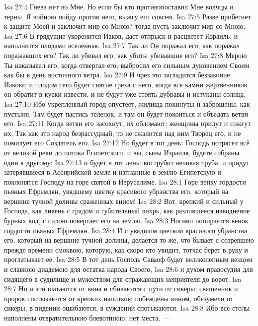\vs Isa 27:4 Гнева нет во Мне. Но если бы кто противопоставил Мне  волчцы и терны, Я войною пойду против него, выжгу его совсем.
\vs Isa 27:5 Разве прибегнет к защите Моей и заключит мир со Мною? тогда пусть заключит мир со Мною.
\vs Isa 27:6 В грядущие  укоренится Иаков, даст отпрыск и расцветет Израиль; и наполнится плодами вселенная.
\vs Isa 27:7 Так ли Он поражал его, как поражал поражавших его? Так ли убивал его, как убиты убивавшие его?
\vs Isa 27:8 Мерою Ты наказывал его, когда отвергал его; выбросил его сильным дуновением Своим как бы в день восточного ветра.
\vs Isa 27:9 И чрез это загладится беззаконие Иакова; и плодом сего будет снятие греха с него, когда все камни жертвенников он обратит в куски извести, и не будут уже стоять дубравы и истуканы солнца.
\vs Isa 27:10 Ибо укрепленный город опустеет, жилища  покинуты и заброшены, как пустыня. Там будет пастись теленок, и там он будет покоиться и объедать ветви его.
\vs Isa 27:11 Когда ветви его засохнут, их обломают; женщины придут и сожгут их. Так как это народ безрассудный, то не сжалится над ним Творец его, и не помилует его Создатель его.
\vs Isa 27:12 Но будет в тот день: Господь потрясет всё от великой реки до потока Египетского, и вы, сыны Израиля, будете собраны один к другому;
\vs Isa 27:13 и будет в тот день: вострубит великая труба, и придут затерявшиеся в Ассирийской земле и изгнанные в землю Египетскую и поклонятся Господу на горе святой в Иерусалиме.
\vs Isa 28:1 Горе венку гордости пьяных Ефремлян, увядшему цветку красивого убранства его, который на вершине тучной долины сраженных вином!
\vs Isa 28:2 Вот, крепкий и сильный у Господа, как ливень с градом и губительный вихрь, как разлившееся наводнение бурных вод, с силою повергает его на землю.
\vs Isa 28:3 Ногами попирается венок гордости пьяных Ефремлян.
\vs Isa 28:4 И с увядшим цветком красивого убранства его, который на вершине тучной долины, делается то же, что бывает с созревшею прежде времени смоквою, которую, как скоро кто увидит, тотчас берет в руку и проглатывает ее.
\rsbpar\vs Isa 28:5 В тот день Господь Саваоф будет великолепным венцом и славною диадемою для остатка народа Своего,
\vs Isa 28:6 и духом правосудия для сидящего в судилище и мужеством для отражающих неприятеля до ворот.
\vs Isa 28:7 Но и эти шатаются от вина и сбиваются с пути от сикеры; священник и пророк спотыкаются от крепких напитков; побеждены вином, обезумели от сикеры, в видении ошибаются, в суждении спотыкаются.
\vs Isa 28:8 Ибо все столы наполнены отвратительною блевотиною, нет  места.~---
